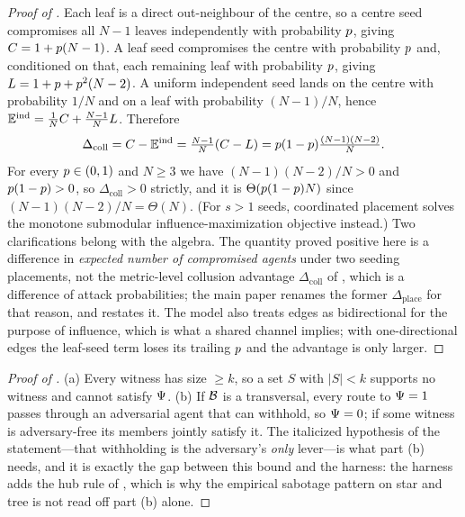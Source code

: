 \begin{proof}[Proof of ]
Each leaf is a direct out-neighbour of the centre, so a centre seed compromises all
$N-1$ leaves independently with probability $p$, giving $C=1+p(N-1)$. A leaf seed
compromises the centre with probability $p$ and, conditioned on that, each remaining
leaf with probability $p$, giving $L=1+p+p^{2}(N-2)$. A uniform independent seed
lands on the centre with probability $1/N$ and on a leaf with probability $(N-1)/N$, hence
$\mathbb{E}^{\mathrm{ind}}=\tfrac1N C+\tfrac{N-1}{N}L$. Therefore
\[
\Delta_{\mathrm{coll}}=C-\mathbb{E}^{\mathrm{ind}}=\tfrac{N-1}{N}(C-L)
=p(1-p)\tfrac{(N-1)(N-2)}{N}.
\]
For every $p\in(0,1)$ and $N\ge3$ we have $(N-1)(N-2)/N>0$ and $p(1-p)>0$, so
$\Delta_{\mathrm{coll}}>0$ strictly, and it is $\Theta(p(1-p)N)$ since
$(N-1)(N-2)/N=\Theta(N)$. (For $s>1$ seeds, coordinated placement solves the monotone
submodular influence-maximization objective instead.) Two clarifications belong with the
algebra. The quantity proved positive here is a difference in \emph{expected number of
compromised agents} under two seeding placements, not the metric-level collusion advantage
$\Delta_{\mathrm{coll}}$ of , which is a difference of attack probabilities; the
main paper renames the former $\Delta_{\mathrm{place}}$ for that reason, and
 restates it. The model also treats edges as bidirectional for the
purpose of influence, which is what a shared channel implies; with one-directional edges the
leaf-seed term loses its trailing $p$ and the advantage is only larger.
\end{proof}

\begin{proof}[Proof of ]
(a) Every witness has size $\ge k$, so a set $S$ with $|S|<k$ supports no witness and
cannot satisfy $\Psi$. (b) If $\mathcal{B}$ is a transversal, every route to
$\Psi=1$ passes through an adversarial agent that can withhold, so $\Psi=0$; if
some witness is adversary-free its members jointly satisfy it. The italicized hypothesis of
the statement---that withholding is the adversary's \emph{only} lever---is what part (b)
needs, and it is exactly the gap between this bound and the harness: the harness adds the
hub rule of , which is why the empirical sabotage pattern on star and tree
is not read off part (b) alone.
\end{proof}

